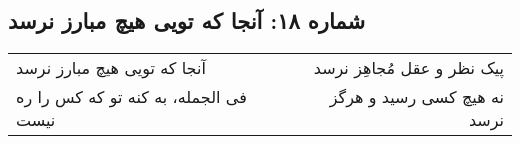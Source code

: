 \begin{center}
\section*{شماره ۱۸: آنجا که تویی هیچ مبارز نرسد}
\label{sec:018}
\begin{longtable}{l p{0.5cm} r}
آنجا که تویی هیچ مبارز نرسد
&&
پیک نظر و عقل مُجاهِز نرسد
\\
فی الجمله، به کنه تو که کس را ره نیست
&&
نه هیچ کسی رسید و هرگز نرسد
\\
\end{longtable}
\end{center}
